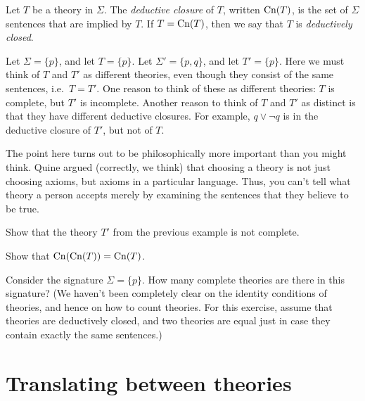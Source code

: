 \begin{defn} Let $T$ be a theory in $\Sigma$.  The \emph{deductive
    closure} of $T$, written $\mathrm{Cn}(T)$, is the set of $\Sigma$
  sentences that are implied by $T$.  If $T=\mathrm{Cn}(T)$, then we say that
  $T$ is \emph{deductively closed}. \end{defn}

\begin{example} Let $\Sigma = \{ p\}$, and let $T = \{ p\}$.  Let
  $\Sigma '= \{ p,q\}$, and let $T' = \{ p\}$.  Here we must think of
  $T$ and $T'$ as different theories, even though they consist of the
  same sentences, i.e.\ $T=T'$.  One reason to think of these as
  different theories: $T$ is complete, but $T'$ is incomplete.
  Another reason to think of $T$ and $T'$ as distinct is that they
  have different deductive closures.  For example, $q\vee \neg q$ is
  in the deductive closure of $T'$, but not of $T$.

  The point here turns out to be philosophically more important than
  you might think.  Quine argued (correctly, we think) that choosing a
  theory is not just choosing axioms, but axioms in a particular
  language.  Thus, you can't tell what theory a person accepts merely
  by examining the sentences that they believe to be
  true.  \end{example}

\begin{exercise} Show that the theory $T'$ from the previous example
  is not complete.  \end{exercise}

\begin{exercise} Show that $\mathrm{Cn}(\mathrm{Cn}(T))=\mathrm{Cn}(T)$. \end{exercise}

\begin{exercise} Consider the signature $\Sigma = \{ p\}$.  How many
  complete theories are there in this signature?  (We haven't been
  completely clear on the identity conditions of theories, and hence
  on how to count theories.  For this exercise, assume that theories
  are deductively closed, and two theories are equal just in case they
  contain exactly the same sentences.) \end{exercise}



\section{Translating between theories}

